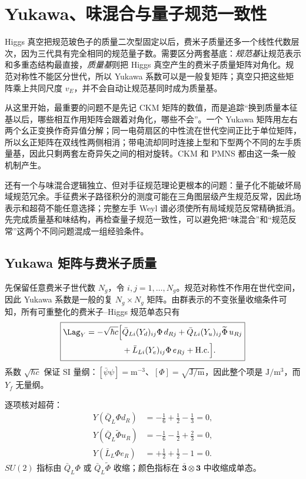 \section{Yukawa、味混合与量子规范一致性}\label{sec:sm-flavor-anomaly-dp11}

Higgs 真空把规范玻色子的质量二次型固定以后，费米子质量还多一个线性代数层次，因为三代具有完全相同的规范量子数。需要区分两套基底：\emph{规范基}让规范表示和多重态结构最直接，\emph{质量基}则把 Higgs 真空产生的费米子质量矩阵对角化。规范对称性不能区分世代，所以 Yukawa 系数可以是一般复矩阵；真空只把这些矩阵乘上共同尺度 $v_E$，并不会自动让规范基同时成为质量基。

从这里开始，最重要的问题不是先记 CKM 矩阵的数值，而是追踪“换到质量本征基以后，哪些相互作用矩阵会跟着对角化，哪些不会”。一个 Yukawa 矩阵用左右两个幺正变换作奇异值分解；同一电荷扇区的中性流在世代空间正比于单位矩阵，所以幺正矩阵在双线性两侧相消；带电流却同时连接上型和下型两个不同的左手质量基，因此只剩两套左奇异矢之间的相对旋转。CKM 和 PMNS 都由这一条一般机制产生。

还有一个与味混合逻辑独立、但对手征规范理论更根本的问题：量子化不能破坏局域规范冗余。手征费米子路径积分的测度可能在三角图层级产生规范反常，因此场表示和超荷不能任意选择；完整左手 Weyl 谱必须使所有局域规范反常精确抵消。先完成质量基和味结构，再检查量子规范一致性，可以避免把“味混合”和“规范反常”这两个不同问题混成一组经验条件。

\subsection{Yukawa 矩阵与费米子质量}

\begin{definition}
先保留任意费米子世代数 $N_g$，令 $i,j=1,\ldots,N_g$。规范对称性不作用在世代空间，因此 Yukawa 系数是一般的复 $N_g\times N_g$ 矩阵。由群表示的不变张量收缩条件可知，所有可重整化的费米子--Higgs 规范单态只有
\begin{equation}
 \boxed{
 \begin{aligned}
 \Lag_Y
 =-\sqrt{\hbar c}\Big[&
 \bar Q_{Li}(Y_d)_{ij}\Phi\,d_{Rj}
 +\bar Q_{Li}(Y_u)_{ij}\widetilde\Phi\,u_{Rj}\\
 &+\bar L_{Li}(Y_e)_{ij}\Phi\,e_{Rj}
 +\mathrm{H.c.}\Big].
 \end{aligned}}
 \label{eq:sm-yukawa-general-dp11}
\end{equation}
系数 $\sqrt{\hbar c}$ 保证 SI 量纲：$[\bar\psi\psi]=\mathrm{m^{-3}}$、$[\Phi]=\sqrt{\mathrm{J/m}}$，因此整个项是 $\mathrm{J/m^3}$，而 $Y_f$ 无量纲。

逐项核对超荷：
\begin{align*}
 Y(\bar Q_L\Phi d_R)
 &=-\frac16+\frac12-\frac13=0,\\
 Y(\bar Q_L\widetilde\Phi u_R)
 &=-\frac16-\frac12+\frac23=0,\\
 Y(\bar L_L\Phi e_R)
 &=+\frac12+\frac12-1=0.
\end{align*}
$SU(2)$ 指标由 $\bar Q_L\Phi$ 或 $\bar Q_L\widetilde\Phi$ 收缩；颜色指标在 $\bar{\mathbf3}\otimes\mathbf3$ 中收缩成单态。
\end{definition}

